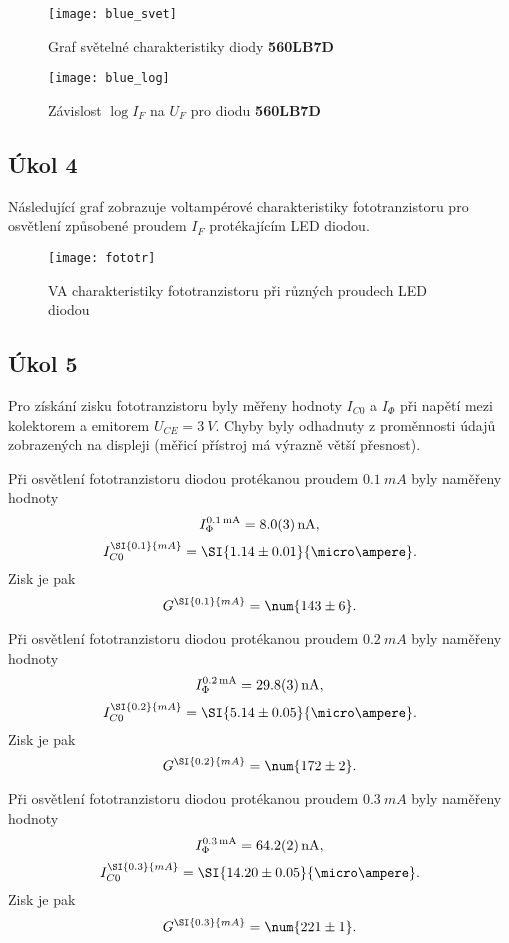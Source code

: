 \documentclass{protokol}
\begin{document}
    \begin{figure}[H]
      \centering
      \texttt{[image: blue\_svet]}
      \caption{Graf světelné charakteristiky diody \textbf{560LB7D}}
      \label{fig:blue_svet}
    \end{figure}

    \begin{figure}[H]
      \centering
      \texttt{[image: blue\_log]}
      \caption{Závislost $\log{I_F}$ na $U_F$ pro diodu \textbf{560LB7D}}
      \label{fig:blue_log}
    \end{figure}

    \subsection*{Úkol 4}

      Následující graf zobrazuje voltampérové charakteristiky fototranzistoru pro osvětlení způsobené proudem $I_F$ protékajícím LED diodou.

    \begin{figure}[H]
      \centering
      \texttt{[image: fototr]}
      \caption{VA charakteristiky fototranzistoru při různých proudech LED diodou}
      \label{fig:fototr}
    \end{figure}

    \subsection*{Úkol 5}

      Pro získání zisku fototranzistoru byly měřeny hodnoty $I_{C0}$ a $I_\Phi$ při napětí mezi kolektorem a emitorem $U_{CE} = \SI{3}{V}$. Chyby byly odhadnuty z proměnnosti údajů zobrazených na displeji (měřicí přístroj má výrazně větší přesnost).

      Při osvětlení fototranzistoru diodou protékanou proudem $\SI{0.1}{mA}$ byly naměřeny hodnoty 
      $$ I_\Phi^{\SI{0.1}{mA}} = \SI{8.0 \pm 0.3}{nA}, $$
      $$ I_{C0}^{\SI{0.1}{mA}} = \SI{1.14 \pm 0.01}{\micro\ampere}. $$
      Zisk je pak 
      $$ G^{\SI{0.1}{mA}} = \num{143 \pm 6}. $$

      Při osvětlení fototranzistoru diodou protékanou proudem $\SI{0.2}{mA}$ byly naměřeny hodnoty 
      $$ I_\Phi^{\SI{0.2}{mA}} = \SI{29.8 \pm 0.3}{nA}, $$
      $$ I_{C0}^{\SI{0.2}{mA}} = \SI{5.14 \pm 0.05}{\micro\ampere}. $$
      Zisk je pak 
      $$ G^{\SI{0.2}{mA}} = \num{172 \pm 2}. $$

      Při osvětlení fototranzistoru diodou protékanou proudem $\SI{0.3}{mA}$ byly naměřeny hodnoty 
      $$ I_\Phi^{\SI{0.3}{mA}} = \SI{64.2 \pm 0.2}{nA}, $$
      $$ I_{C0}^{\SI{0.3}{mA}} = \SI{14.20 \pm 0.05}{\micro\ampere}. $$
      Zisk je pak 
      $$ G^{\SI{0.3}{mA}} = \num{221 \pm 1}. $$
\end{document}
